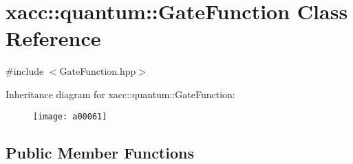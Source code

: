\hypertarget{a00061}{}\section{xacc\+:\+:quantum\+:\+:Gate\+Function Class Reference}
\label{a00061}


{\ttfamily \#include $<$Gate\+Function.\+hpp$>$}

Inheritance diagram for xacc\+:\+:quantum\+:\+:Gate\+Function\+:\begin{figure}[H]
\begin{center}
\leavevmode
\texttt{[image: a00061]}
\end{center}
\end{figure}
\subsection*{Public Member Functions}
